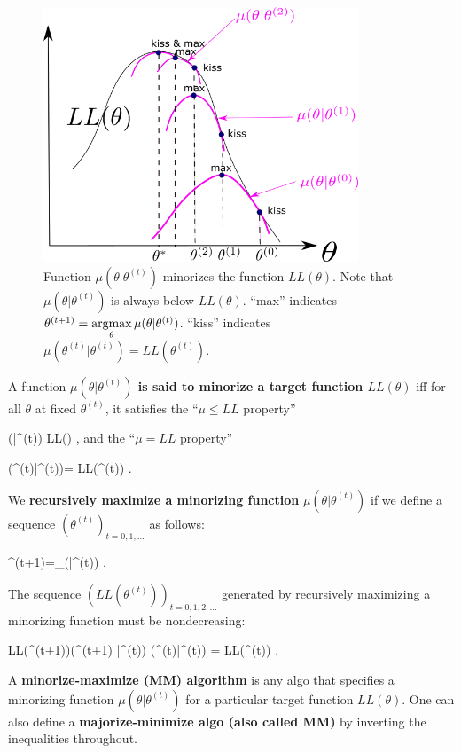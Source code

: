 \begin{figure}[h!]
\centering
\includegraphics[width=3.7in]
{emax/minorize.png}
\caption{Function $\mu(\theta|\theta^{(t)})$
minorizes the function $ LL(\theta)$.
Note that $\mu(\theta|\theta^{(t)})$
is always below
 $ LL(\theta)$.
\enquote{max} indicates
$\theta^{(t+1)}=
\mathop{\mathrm{argmax}}\limits_\theta \mu(\theta|\theta^{(t)})$.
\enquote{kiss} indicates
 $\mu(\theta^{(t)}|\theta^{(t)})=
 LL(\theta^{(t)})$.
}
\label{fig-minorize}
\end{figure}



A function {\bf $\mu(\theta|\theta^{(t)})$
is said to minorize
 a target
 function $ LL(\theta)$}
iff for all $ \theta$ at fixed
$\theta^{(t)}$,
it satisfies the
\enquote{$\mu\leq LL$ property}


\beq
\mu(\theta|\theta^{(t)})\leq
 LL(\theta)
\;,
\eeq
and
the \enquote{$\mu= LL$ property}

\beq
\mu(\theta^{(t)}|\theta^{(t)})=
 LL(\theta^{(t)})
\;.
\eeq

We  {\bf recursively maximize a minorizing function} $\mu(\theta|\theta^{(t)})$
if we define a sequence $(\theta^{(t)})_{t=0, 1, \ldots}$
as follows:

\beq
\theta^{(t+1)}=\argmax_\theta \mu(\theta|\theta^{(t)})
\;.
\eeq

The sequence
$( LL(\theta^{(t)}))_{t=0, 1, 2, \ldots}$
generated by
recursively maximizing a minorizing function
must be nondecreasing:

\beq
 LL(\theta^{(t+1)})\geq \mu(\theta^{(t+1)}
|\theta^{(t)})\geq
 \mu(\theta^{(t)}|\theta^{(t)})
=  LL(\theta^{(t)})
\;.
\eeq

A {\bf
minorize-maximize (MM) algorithm}
is any algo that
specifies a
minorizing function $\mu(\theta|\theta^{(t)})$
for a particular target
 function $ LL(\theta)$.
One can also define a
{\bf majorize-minimize algo (also
called  MM)}
by inverting the inequalities throughout.


